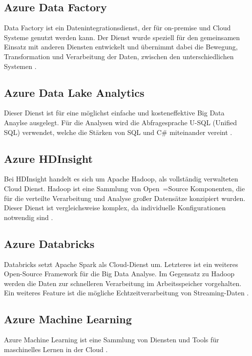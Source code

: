 \subsection{Azure Data Factory} \label{sec:grundlagen:azure_dienste:dataFactory}
Data Factory ist ein Datenintegrationsdienst, der für on-premise und Cloud Systeme genutzt werden kann. Der Dienst wurde speziell für den gemeinsamen Einsatz mit anderen Diensten entwickelt und übernimmt dabei die Bewegung, Transformation und Verarbeitung der Daten, zwischen den unterschiedlichen Systemen \cite{klein_iot_2017}.

\subsection{Azure Data Lake Analytics} \label{sec:grundlagen:azure_dienste:dataLakeAnalytics}
Dieser Dienst ist für eine möglichst einfache und kosteneffektive Big Data Anaylse ausgelegt. Für die Analysen wird die Abfragesprache U-SQL (Unified SQL) verwendet, welche die Stärken von SQL und C\# miteinander vereint \cite{klein_iot_2017}. 

\subsection{Azure HDInsight} \label{sec:grundlagen:azure_dienste:hdInsight}
Bei HDInsight handelt es sich um Apache Hadoop, als vollständig verwalteten Cloud Dienst. Hadoop ist eine Sammlung von Open~=Source Komponenten, die für die verteilte Verarbeitung und Analyse großer Datensätze konzipiert wurden. Dieser Dienst ist vergleichsweise komplex, da individuelle Konfigurationen notwendig sind \cite{klein_iot_2017}.

\subsection{Azure Databricks} \label{sec:grundlagen:azure_dienste:databricks}
Databricks setzt Apache Spark als Cloud-Dienst um. Letzteres ist ein weiteres Open-Source Framework für die Big Data Analyse. Im Gegensatz zu Hadoop werden die Daten zur schnelleren Verarbeitung im Arbeitsspeicher vorgehalten. Ein weiteres Feature ist die mögliche Echtzeitverarbeitung von Streaming-Daten \cite{soh_data_2020}.

\subsection{Azure Machine Learning} \label{sec:grundlagen:azure_dienste:machineLearning}
Azure Machine Learning ist eine Sammlung von Diensten und Tools für maschinelles Lernen in der Cloud \cite{soh_data_2020}.

